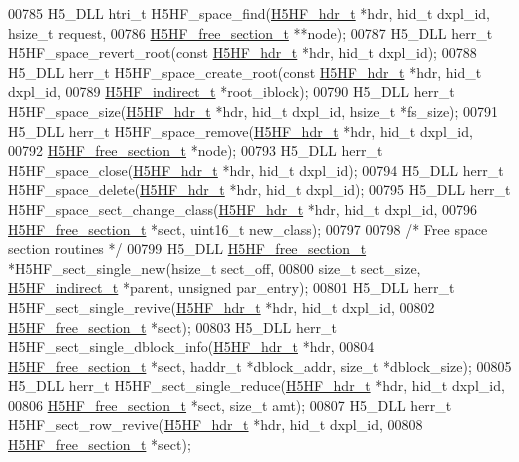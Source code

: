 \begin{DoxyCode}
00785 H5\_DLL htri\_t H5HF\_space\_find(\hyperlink{struct_h5_h_f__hdr__t}{H5HF\_hdr\_t} *hdr, hid\_t dxpl\_id, hsize\_t request,
00786     \hyperlink{struct_h5_h_f__free__section__t}{H5HF\_free\_section\_t} **node);
00787 H5\_DLL herr\_t H5HF\_space\_revert\_root(\textcolor{keyword}{const} \hyperlink{struct_h5_h_f__hdr__t}{H5HF\_hdr\_t} *hdr, hid\_t dxpl\_id);
00788 H5\_DLL herr\_t H5HF\_space\_create\_root(\textcolor{keyword}{const} \hyperlink{struct_h5_h_f__hdr__t}{H5HF\_hdr\_t} *hdr, hid\_t dxpl\_id,
00789     \hyperlink{struct_h5_h_f__indirect__t}{H5HF\_indirect\_t} *root\_iblock);
00790 H5\_DLL herr\_t H5HF\_space\_size(\hyperlink{struct_h5_h_f__hdr__t}{H5HF\_hdr\_t} *hdr, hid\_t dxpl\_id, hsize\_t *fs\_size);
00791 H5\_DLL herr\_t H5HF\_space\_remove(\hyperlink{struct_h5_h_f__hdr__t}{H5HF\_hdr\_t} *hdr, hid\_t dxpl\_id,
00792     \hyperlink{struct_h5_h_f__free__section__t}{H5HF\_free\_section\_t} *node);
00793 H5\_DLL herr\_t H5HF\_space\_close(\hyperlink{struct_h5_h_f__hdr__t}{H5HF\_hdr\_t} *hdr, hid\_t dxpl\_id);
00794 H5\_DLL herr\_t H5HF\_space\_delete(\hyperlink{struct_h5_h_f__hdr__t}{H5HF\_hdr\_t} *hdr, hid\_t dxpl\_id);
00795 H5\_DLL herr\_t H5HF\_space\_sect\_change\_class(\hyperlink{struct_h5_h_f__hdr__t}{H5HF\_hdr\_t} *hdr, hid\_t dxpl\_id,
00796     \hyperlink{struct_h5_h_f__free__section__t}{H5HF\_free\_section\_t} *sect, uint16\_t new\_class);
00797 
00798 \textcolor{comment}{/* Free space section routines */}
00799 H5\_DLL \hyperlink{struct_h5_h_f__free__section__t}{H5HF\_free\_section\_t} *H5HF\_sect\_single\_new(hsize\_t sect\_off,
00800     \textcolor{keywordtype}{size\_t} sect\_size, \hyperlink{struct_h5_h_f__indirect__t}{H5HF\_indirect\_t} *parent, \textcolor{keywordtype}{unsigned} par\_entry);
00801 H5\_DLL herr\_t H5HF\_sect\_single\_revive(\hyperlink{struct_h5_h_f__hdr__t}{H5HF\_hdr\_t} *hdr, hid\_t dxpl\_id,
00802     \hyperlink{struct_h5_h_f__free__section__t}{H5HF\_free\_section\_t} *sect);
00803 H5\_DLL herr\_t H5HF\_sect\_single\_dblock\_info(\hyperlink{struct_h5_h_f__hdr__t}{H5HF\_hdr\_t} *hdr,
00804     \hyperlink{struct_h5_h_f__free__section__t}{H5HF\_free\_section\_t} *sect, haddr\_t *dblock\_addr, \textcolor{keywordtype}{size\_t} *dblock\_size);
00805 H5\_DLL herr\_t H5HF\_sect\_single\_reduce(\hyperlink{struct_h5_h_f__hdr__t}{H5HF\_hdr\_t} *hdr, hid\_t dxpl\_id,
00806     \hyperlink{struct_h5_h_f__free__section__t}{H5HF\_free\_section\_t} *sect, \textcolor{keywordtype}{size\_t} amt);
00807 H5\_DLL herr\_t H5HF\_sect\_row\_revive(\hyperlink{struct_h5_h_f__hdr__t}{H5HF\_hdr\_t} *hdr, hid\_t dxpl\_id,
00808     \hyperlink{struct_h5_h_f__free__section__t}{H5HF\_free\_section\_t} *sect);

\end{DoxyCode}
